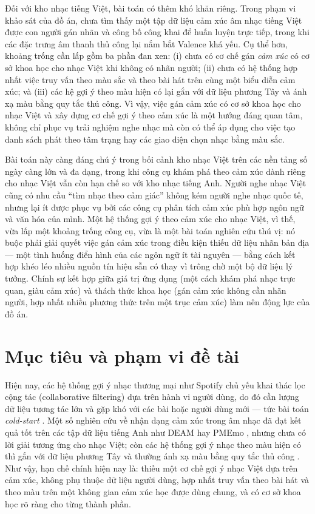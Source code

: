\documentclass[../DoAn.tex]{subfiles}
\begin{document}
Đối với kho nhạc tiếng Việt, bài toán có thêm khó khăn riêng. Trong phạm vi khảo sát của đồ án, chưa tìm thấy một tập dữ liệu cảm xúc âm nhạc tiếng Việt được con người gán nhãn và công bố công khai để huấn luyện trực tiếp, trong khi các đặc trưng âm thanh thủ công lại nắm bắt Valence khá yếu. Cụ thể hơn, khoảng trống cần lấp gồm ba phần đan xen: (i) chưa có cơ chế gán \textit{cảm xúc} có cơ sở khoa học cho nhạc Việt khi không có nhãn người; (ii) chưa có hệ thống hợp nhất việc truy vấn theo màu sắc và theo bài hát trên cùng một biểu diễn cảm xúc; và (iii) các hệ gợi ý theo màu hiện có lại gắn với dữ liệu phương Tây và ánh xạ màu bằng quy tắc thủ công. Vì vậy, việc gán cảm xúc có cơ sở khoa học cho nhạc Việt và xây dựng cơ chế gợi ý theo cảm xúc là một hướng đáng quan tâm, không chỉ phục vụ trải nghiệm nghe nhạc mà còn có thể áp dụng cho việc tạo danh sách phát theo tâm trạng hay các giao diện chọn nhạc bằng màu sắc.

Bài toán này càng đáng chú ý trong bối cảnh kho nhạc Việt trên các nền tảng số ngày càng lớn và đa dạng, trong khi công cụ khám phá theo cảm xúc dành riêng cho nhạc Việt vẫn còn hạn chế so với kho nhạc tiếng Anh. Người nghe nhạc Việt cũng có nhu cầu ``tìm nhạc theo cảm giác'' không kém người nghe nhạc quốc tế, nhưng lại ít được phục vụ bởi các công cụ phân tích cảm xúc phù hợp ngôn ngữ và văn hóa của mình. Một hệ thống gợi ý theo cảm xúc cho nhạc Việt, vì thế, vừa lấp một khoảng trống công cụ, vừa là một bài toán nghiên cứu thú vị: nó buộc phải giải quyết việc gán cảm xúc trong điều kiện thiếu dữ liệu nhãn bản địa --- một tình huống điển hình của các ngôn ngữ ít tài nguyên --- bằng cách kết hợp khéo léo nhiều nguồn tín hiệu sẵn có thay vì trông chờ một bộ dữ liệu lý tưởng. Chính sự kết hợp giữa giá trị ứng dụng (một cách khám phá nhạc trực quan, giàu cảm xúc) và thách thức khoa học (gán cảm xúc không cần nhãn người, hợp nhất nhiều phương thức trên một trục cảm xúc) làm nên động lực của đồ án.

\section{Mục tiêu và phạm vi đề tài}
\label{section:1.2}
Hiện nay, các hệ thống gợi ý nhạc thương mại như Spotify chủ yếu khai thác lọc cộng tác (collaborative filtering) dựa trên hành vi người dùng, do đó cần lượng dữ liệu tương tác lớn và gặp khó với các bài hoặc người dùng mới --- tức bài toán \textit{cold-start} \cite{schein2002coldstart}. Một số nghiên cứu về nhận dạng cảm xúc trong âm nhạc đã đạt kết quả tốt trên các tập dữ liệu tiếng Anh như DEAM \cite{aljanaki2017deam} hay PMEmo \cite{zhang2018pmemo}, nhưng chưa có lời giải tương ứng cho nhạc Việt; còn các hệ thống gợi ý nhạc theo màu hiện có thì gắn với dữ liệu phương Tây và thường ánh xạ màu bằng quy tắc thủ công \cite{pesek2017moodo, kittimathaveenan2020color}. Như vậy, hạn chế chính hiện nay là: thiếu một cơ chế gợi ý nhạc Việt dựa trên cảm xúc, không phụ thuộc dữ liệu người dùng, hợp nhất truy vấn theo bài hát và theo màu trên một không gian cảm xúc học được dùng chung, và có cơ sở khoa học rõ ràng cho từng thành phần.
\end{document}
